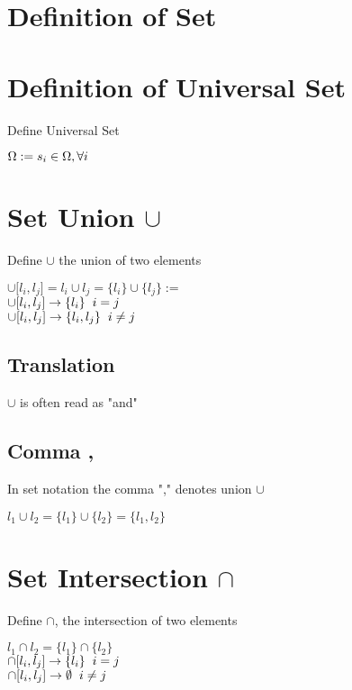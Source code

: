 \documentclass[11pt]{article}
\begin{document}
\section{Definition of Set}



\section{Definition of Universal Set}
Define Universal Set
\begin{center}
$
\Omega := s_i \in \Omega, \forall i \hspace{5mm}
$
\end{center}





\section{Set Union $\cup$}
Define $\cup$ the union of two elements
\begin{center}
$\cup \lbrack l_i,l_j\rbrack = l_i \cup l_j = \{l_i\} \cup \{l_j\} :=$
\\ \vspace{2mm}
$\cup \lbrack l_i,l_j\rbrack \rightarrow \{l_i\} \hspace{2mm} i = j$
\\
$\cup \lbrack l_i,l_j\rbrack \rightarrow \{l_i,l_j\} \hspace{2mm} i \neq j$
\end{center}

\subsection{Translation}
$\cup$ is often read as "and"

\subsection{Comma ,}
In set notation the comma "," denotes union $\cup$
\begin{center}
$l_1 \cup l_2 = \{l_1\} \cup \{l_2\} = \{l_1,l_2\}$
\end{center}





\section{Set Intersection $\cap$}
Define $\cap$, the intersection of two elements
\begin{center}
$l_1 \cap l_2 = \{l_1\} \cap\{ l_2\}$
\\ \vspace{2mm}
$\cap \lbrack l_i,l_j\rbrack \rightarrow \{l_i\} \hspace{2mm} i = j$
\\
$\cap \lbrack l_i,l_j\rbrack \rightarrow \emptyset \hspace{2mm} i \neq j$
\end{center}
\end{document}
